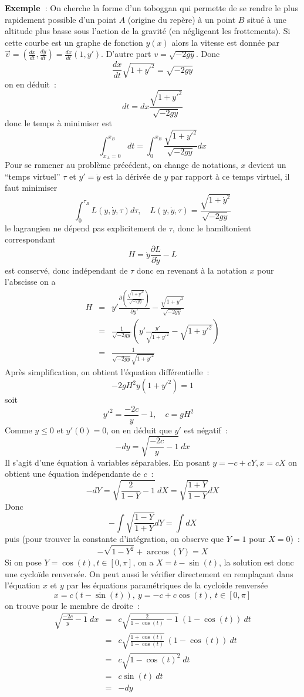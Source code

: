 \documentclass[a4paper,11pt]{article}
\begin{document}
\begin{giacjshere}
{\bf Exemple~}: On cherche la forme d'un toboggan qui permette
de se rendre le plus rapidement possible d'un point $A$ (origine
du rep\`ere) \`a un point $B$ situ\'e \`a une altitude plus basse 
sous l'action de la gravit\'e (en n\'egligeant les frottements). 
Si cette courbe est un graphe de fonction $y(x)$ alors la vitesse
est donn\'ee par 
$\overrightarrow{v}=(\frac{dx}{dt},\frac{dy}{dt})=\frac{dx}{dt}(1,y')$.
D'autre part $v=\sqrt{-2gy}$. Donc
$$ \frac{dx}{dt}\sqrt{1+y'^2}=\sqrt{-2gy}$$
on en d\'eduit~:
$$ dt = dx \frac{\sqrt{1+y'^2}}{\sqrt{-2gy}}$$
donc le temps \`a minimiser est
$$ \int_{x_A=0}^{x_B} dt = \int_0^{x_B}
\frac{\sqrt{1+y'^2}}{\sqrt{-2gy}} dx$$
Pour se ramener au probl\`eme pr\'ec\'edent, 
on change de notations, $x$ devient un ``temps virtuel''
$\tau$ et $y'=\dot{y}$ est la d\'eriv\'ee de $y$ par
rapport \`a ce temps virtuel, il faut minimiser
$$ \int_0^{\tau_B} L(y,\dot{y},\tau) d\tau, \quad 
L(y,\dot{y},\tau)=\frac{\sqrt{1+\dot{y}^2}}{\sqrt{-2gy}} $$
le lagrangien ne d\'epend pas explicitement de $\tau$, donc le
hamiltonient correspondant
$$ H=\dot{y} \frac{\partial L}{\partial\dot{y}}  - L $$
est conserv\'e, donc ind\'ependant de $\tau$ donc en revenant
\`a la notation $x$ pour l'abscisse on a
\begin{eqnarray*}
 H&=&y'  \frac{ \partial{ \left( \frac{\sqrt{1+y'^2}}{\sqrt{-2gy}}
    \right)} }{\partial y'}- 
\frac{\sqrt{1+y'^2}}{\sqrt{-2gy}}\\
&=& \frac1 {\sqrt{-2gy}} \left( y' \frac{y'}{\sqrt{1+y'^2}} -
  \sqrt{1+y'^2} \right)\\
&=&\frac1 {\sqrt{-2gy} \sqrt{1+y'^2}} 
\end{eqnarray*}
Apr\`es simplification, on obtient l'\'equation diff\'erentielle~:
$$ -2gH^2y (1+y'^2) = 1$$
soit 
$$ y'^2=\frac{-2c}{y}-1, \quad c=gH^2\quad $$
Comme $y\leq 0$ et $y'(0)=0$, on en d\'eduit que $y'$ est n\'egatif~:
$$ -dy = \sqrt{\frac{-2c}{y}-1} \ dx$$
Il s'agit d'une \'equation \`a variables s\'eparables. En posant
$y=-c+cY, x=cX$
on obtient une \'equation ind\'ependante de $c$~:
$$ -dY=\sqrt{\frac{2}{1-Y}-1} \ dX=\sqrt{\frac{1+Y}{1-Y}} dX$$
Donc
$$ -\int \sqrt{\frac{1-Y}{1+Y}} dY = \int dX $$
puis (pour trouver la constante d'int\'egration, on observe que
$Y=1$ pour $X=0$)~:
$$ -\sqrt{1-Y^2}+\arccos(Y)=X$$
Si on pose $Y=\cos(t), t \in [0,\pi]$, on a $X=t - \sin(t)$,
la solution est donc une cyclo\"ide renvers\'ee.
On peut aussi le v\'erifier directement
en rempla\c{c}ant dans l'\'equation $x$ et $y$
par les \'equations param\'etriques de la cyclo\"ide renvers\'ee
$$x=c(t-\sin(t)), \ y=-c+c\cos(t), \ t \in [0,\pi]$$
on trouve pour le membre de droite~:
\begin{eqnarray*}
\sqrt{\frac{-2c}{y}-1} \ dx &=& c \sqrt{\frac{2}{1-\cos(t)}-1} \ 
(1-\cos(t)) \ dt\\
&=& c \sqrt{\frac{1+\cos(t)}{1-\cos(t)}} \  (1-\cos(t)) \ dt \\
&=& c \sqrt{1-\cos(t)^2} \ dt\\
&=& c \sin(t) \ dt \\
&=& -dy
\end{eqnarray*}


\end{giacjshere}
\end{document}
